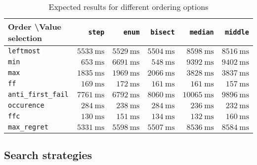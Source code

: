 \documentclass[runningheads]{llncs}
\begin{document}
\begin{table}[!h]
    \centering
    \caption{Expected results for different ordering options}
    \begin{tabular}{| l | r r r r r |}
        \hline
        \textbf{Order \textbackslash Value selection}& \texttt{step}              & \texttt{enum}              & \texttt{bisect}            & \texttt{median}             & \texttt{middle}            \\ \hline
        \texttt{leftmost}                            & $\SI{5533}{\milli\second}$ & $\SI{5529}{\milli\second}$ & $\SI{5504}{\milli\second}$ & $\SI{ 8598}{\milli\second}$ & $\SI{8516}{\milli\second}$ \\
        \texttt{min}                                 & $\SI{ 653}{\milli\second}$ & $\SI{6691}{\milli\second}$ & $\SI{ 548}{\milli\second}$ & $\SI{ 9392}{\milli\second}$ & $\SI{9402}{\milli\second}$ \\
        \texttt{max}                                 & $\SI{1835}{\milli\second}$ & $\SI{1969}{\milli\second}$ & $\SI{2066}{\milli\second}$ & $\SI{ 3828}{\milli\second}$ & $\SI{3837}{\milli\second}$ \\
        \texttt{ff}                                  & $\SI{ 169}{\milli\second}$ & $\SI{ 172}{\milli\second}$ & $\SI{ 161}{\milli\second}$ & $\SI{  161}{\milli\second}$ & $\SI{ 157}{\milli\second}$ \\
        \texttt{anti\_first\_fail}                   & $\SI{7761}{\milli\second}$ & $\SI{6792}{\milli\second}$ & $\SI{8060}{\milli\second}$ & $\SI{10065}{\milli\second}$ & $\SI{9896}{\milli\second}$ \\
        \texttt{occurence}                           & $\SI{ 284}{\milli\second}$ & $\SI{ 238}{\milli\second}$ & $\SI{ 284}{\milli\second}$ & $\SI{  236}{\milli\second}$ & $\SI{ 232}{\milli\second}$ \\
        \texttt{ffc}                                 & $\SI{ 130}{\milli\second}$ & $\SI{ 151}{\milli\second}$ & $\SI{ 134}{\milli\second}$ & $\SI{  132}{\milli\second}$ & $\SI{ 160}{\milli\second}$ \\
        \texttt{max\_regret}                         & $\SI{5331}{\milli\second}$ & $\SI{5598}{\milli\second}$ & $\SI{5507}{\milli\second}$ & $\SI{ 8536}{\milli\second}$ & $\SI{8584}{\milli\second}$ \\ \hline
    \end{tabular}
\end{table}

\subsection{Search strategies}
\end{document}
